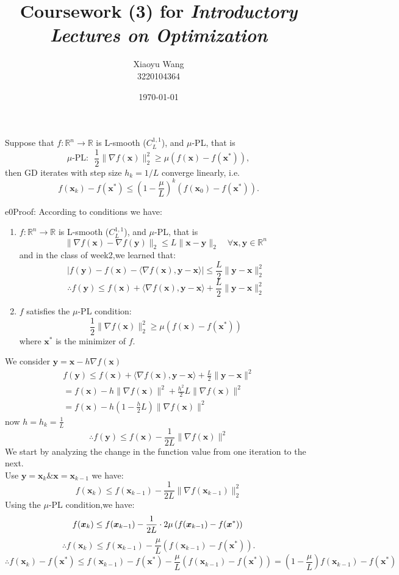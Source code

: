 \documentclass{article}
\title{Coursework (3) for \emph{Introductory Lectures on Optimization}}
\author{Xiaoyu Wang \\ 3220104364}
\date{\today}
\newcommand{\xB}{\bm{x}}
\newcommand{\yB}{\bm{y}}
\begin{document}
\maketitle

\begin{excercise}\label{e0}
	Suppose that $f : \mathbb{R}^n \rightarrow \mathbb{R}$ is L-smooth ($C_L^{1,1}$), and  $\mu$-PL, that is 
	\[
	\textrm{$\mu$-PL:~~}\frac{1}{2} \| \nabla f(\xB) \|_2^2 \geq \mu \left( f(\xB) - f(\xB^*) \right),
	\]
	then GD iterates with step size $h_k = 1/L $ converge linearly, i.e.
	\[
	f(\xB_{k}) - f(\xB^*) \leq \left( 1 - \frac{\mu}{L} \right)^k \left(  f(\xB_0) - f(\xB^*)\right).
	\]
\end{excercise}

\begin{PROOF}{e0}Proof:
	According to conditions we have:
\begin{enumerate}
	\item $f : \mathbb{R}^n \rightarrow \mathbb{R}$ is L-smooth ($C_L^{1,1}$), and  $\mu$-PL, that is 
		\[
			\|\nabla f(\xB) - \nabla f(\yB)\|_2 \leq L \|\xB - \yB\|_2 \quad \forall \xB, \yB \in \mathbb{R}^n
	  	\]
		and in the class of week2,we learned that:\\
		\[ \lvert f(\bm y) - f(\bm x)-\langle\nabla f(\bm x),\bm y - \bm x\rangle \rvert\le \frac{L}{2}\lVert \bm y-\bm x\rVert^2_2 \]
		\[\therefore  f(\bm y) \le f(\bm x) + \langle\nabla f(\bm x),\bm y - \bm x\rangle + \frac{L}{2}\lVert \bm y-\bm x\rVert^2_2 \]
		\item  \( f \) satisfies the \(\mu\)-PL condition:
		\[
		\frac{1}{2} \|\nabla f(\xB)\|_2^2 \geq \mu \left( f(\xB) - f(\xB^*) \right)
		\]
		where \( \xB^* \) is the minimizer of \( f \).
\end{enumerate}	
	We consider \(\yB = \xB - h\nabla f(\xB) \)
\begin{align}
		f(\yB) \le f(\xB)+\langle \nabla f(\xB),\yB-\xB\rangle +\frac{L}{2}\lVert \yB-\xB\rVert^2\\ 
		= f(\xB)-h\lVert\nabla f(\xB)\rVert^2+\frac{h^2}{2}L\lVert\nabla f(\xB)\rVert^2 \\
		= f(\xB)-h\left(1-\frac{h}{2}L\right)\lVert\nabla f(\xB)\rVert^2 
\end{align}
	now $h = h_k = \frac{1}{L}$
	\[
	\therefore f(\yB) \le f(\xB)-\frac{1}{2L}\lVert\nabla f(\xB)\rVert^2 
	\]
	We start by analyzing the change in the function value from one iteration to the next. \\
	Use $\yB = \xB_{k} \& \xB = \xB_{k-1}$ we have:
	\[
	f(\xB_{k}) \leq f(\xB_{k-1}) - \frac{1}{2L} \|\nabla f(\xB_{k-1})\|_2^2
	\]
	Using the \(\mu\)-PL condition,we have:
	\[
	f(\xB_{k}) \leq f(\xB_{k-1}) - \frac{1}{2L} \cdot 2\mu \left( f(\xB_{k-1}) - f(\xB^*) \right)\\
	\]
	\[
	\therefore f(\xB_{k}) \leq f(\xB_{k-1}) - \frac{\mu}{L} \left( f(\xB_{k-1}) - f(\xB^*) \right).
	\]
	\[
	\therefore f(\xB_{k}) - f(\xB^*) \leq f(\xB_{k-1}) - f(\xB^*) - \frac{\mu}{L} \left( f(\xB_{k-1}) - f(\xB^*) \right)
	= \left(1 - \frac{\mu}{L}\right) f(\xB_{k-1}) - f(\xB^*)
	\]


\end{PROOF}
\end{document}
